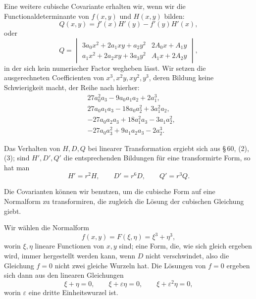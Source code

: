 \documentclass[11pt]{article}
\begin{document}
Eine weitere cubische Covariante erhalten wir, wenn wir die Functionaldeterminante von $f(x,y)$ und $H(x,y)$ bilden:
\begin{equation}
 Q(x,y)=f'(x)H'(y)-f'(y)H'(x),
\tag{6}
\end{equation}
oder
\begin{equation}
 Q=\begin{vmatrix}
 3a_0x^2+2a_1xy+a_2y^2 & 2A_0x+A_1y\\
 a_1x^2+2a_2xy+3a_3y^2 & A_1x+2A_2y
 \end{vmatrix},
\tag{7}
\end{equation}
in der sich kein numerischer Factor wegheben lässt. Wir setzen die ausgerechneten Coefficienten von $x^3,x^2y,xy^2,y^3$, deren Bildung keine Schwierigkeit macht, der Reihe nach hierher:
\[
\begin{aligned}
 &27a_0^2a_3-9a_0a_1a_2+2a_1^3,\\
 &27a_0a_1a_3-18a_0a_2^2+3a_1^2a_2,\\
 &-27a_0a_2a_3+18a_1^2a_3-3a_1a_2^2,\\
 &-27a_0a_3^2+9a_1a_2a_3-2a_2^3.
\end{aligned}
\]

Das Verhalten von $H,D,Q$ bei linearer Transformation ergiebt sich aus \S\,60, (2), (3); sind $H',D',Q'$ die entsprechenden Bildungen für eine transformirte Form, so hat man
\begin{equation}
 H'=r^2H,\qquad D'=r^6D,\qquad Q'=r^3Q.
\tag{8}
\end{equation}

Die Covarianten können wir benutzen, um die cubische Form auf eine Normalform zu transformiren, die zugleich die Lösung der cubischen Gleichung giebt.

Wir wählen die Normalform
\begin{equation}
 f(x,y)=F(\xi,\eta)=\xi^3+\eta^3,
\tag{9}
\end{equation}
worin $\xi,\eta$ lineare Functionen von $x,y$ sind; eine Form, die, wie sich gleich ergeben wird, immer hergestellt werden kann, wenn $D$ nicht verschwindet, also die Gleichung $f=0$ nicht zwei gleiche Wurzeln hat. Die Lösungen von $f=0$ ergeben sich dann aus den linearen Gleichungen
\[
 \xi+\eta=0,
 \qquad \xi+\varepsilon\eta=0,
 \qquad \xi+\varepsilon^2\eta=0,
\]
worin $\varepsilon$ eine dritte Einheitswurzel ist.
\end{document}
